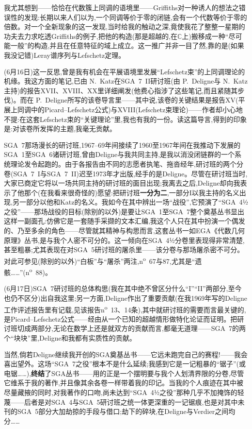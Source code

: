 我尤其想到——恰恰在代数簇上同调的语境里——Griffiths对一种诱人的想法之错误性的发现:长期以来人们以为,一个同调等价于零的闭链,会有一个代数等价于零的倍数。对一个全新现象的这一发现,当时给我的触动之深,竟使我花了整整一星期的功夫去力求吃透Griffiths的例子,把他的构造(那是超越的,在$\mathbb{C}$上)搬移成一种“尽可能一般”的构造,并且在任意特征的域上成立。这一推广并非一目了然,靠的是(如果我没记错)Leray谱序列与Lefschetz定理。

(6月16日)这一反思,曾是我有机会在平展语境里发展“Lefschetz束”的上同调理论的机缘。我这方面的笔记,已由 N.~Katz在SGA~7~II研讨班(由 P.~Deligne与 N.~Katz主持)的报告XVII、XVIII、XX里详细阐发(他费心指涉了这些笔记,而且紧随其步伐)。而在 P.~Deligne所写的该卷导言里——其中说,该卷的关键结果是报告XV(平展上同调中的Picard--Lefschetz公式)与XVIII(Lefschetz束理论)——作者却小心地不提:在这套Lefschetz束的“关键理论”里,我也有我的一份。读这篇导言,得到的印象是:对该卷所发挥的主题,我毫无贡献。

SGA~7那场漫长的研讨班,1967--69年间接续了1960至1967年间在我推动下发展的SGA~1至SGA~6诸研讨班,曾由Deligne与我共同主持,是我以消没闭链群的一个系统理论发令起跑的。由于各报告由不同的志愿者执笔、拖沓经年,研讨班的两个分卷(SGA~7~I与SGA~7~II)迟至1973年才出版,经手的是\dmark{}Deligne。尽管在研讨班当时,大家已商定它将以一场共同主持的研讨班的面目出现;我离去之后,Deligne却向我表示了他那个(在我看来很奇怪的)愿望:把研讨班\textbf{一分为二},一部分I以我主持的名义出现,另一部分以他和Katz的名义。我如今在其中辨出一场“战役”,它预演了“SGA~4½之役”——那场战役的目标(除别的以外)是要让SGA~1至SGA~7整个奠基丛书显出这样一副面孔:仿佛它是一套随手采撷的文本汇编,我这个人只在其中扮演一个偶发的、乃至多余的角色——尽管就其精神与构思而言,这套丛书一如EGA《代数几何原理》丛书,是与我个人密不可分的。这一倾向在SGA~4½分卷里表现得非常清楚,甚至粗暴;尤其表现在对SGA~5研讨班的屠杀里——该分卷与那场屠杀密不可分。对此可参见(除别的以外)“白板”与“屠杀”两注,n\textsuperscript{o}~67与87,尤其是“遗骸……”(n\textsuperscript{o}~88)。

(6月17日)SGA~7研讨班的总体构思(我在其中绝不曾区分什么“I”“II”两部分,至今也仍不区分)出自我这里;另一方面,Deligne作出了重要贡献(在我1969年写的Deligne工作评述报告里有记载,见该报告n\textsuperscript{o}~13、14条),其中就研讨班的需要而言最关键的,是Picard--Lefschetz公式——经由从一个已知的超越情形做特化论证而证明。把研讨班切成两部分,无论在数学上还是就双方的贡献而言,都毫无道理——SGA~7的两个“块块”里,Deligne和我都有实质性的贡献。

当然,倘若Deligne继续我开创的SGA奠基丛书——它远未跑完自己的赛程!——我会喜出望外。这场“SGA~7之役”根本不是什么延续;我感到它是一记粗暴的“锯子”(或电锯……),\textbf{终结}了SGA丛书——用的正是一个摆明要与我个人划清界限的分卷,尽管它维系于我的著作,并且像其余各卷一样带着我的印记。当我的个人痕迹在其中被尽量藏掖的同时,对我著作的口吻,尚未达到“SGA~4½之役”那种几乎不加掩饰的轻蔑——后者是对SGA~4与SGA~5研讨班之统一体更深重的一记锯痕,也是对其中未刊的SGA~5部分大加劫掠的手段与借口;劫下的碎块,在Deligne与Verdier之间均分……

